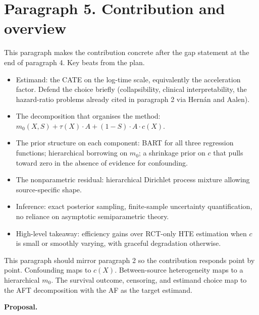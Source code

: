 \newpage
\section*{Paragraph 5. Contribution and overview}

This paragraph makes the contribution concrete after the gap statement at the end of paragraph 4.
Key beats from the plan.
\begin{itemize}
  \item Estimand: the CATE on the log-time scale, equivalently the acceleration factor.
        Defend the choice briefly (collapsibility, clinical interpretability, the hazard-ratio problems already cited in paragraph 2 via Hern\'an and Aalen).
  \item The decomposition that organises the method: $m_0(X, S) + \tau(X)\cdot A + (1-S)\cdot A \cdot c(X)$.
  \item The prior structure on each component: BART for all three regression functions; hierarchical borrowing on $m_0$; a shrinkage prior on $c$ that pulls toward zero in the absence of evidence for confounding.
  \item The nonparametric residual: hierarchical Dirichlet process mixture allowing source-specific shape.
  \item Inference: exact posterior sampling, finite-sample uncertainty quantification, no reliance on asymptotic semiparametric theory.
  \item High-level takeaway: efficiency gains over RCT-only HTE estimation when $c$ is small or smoothly varying, with graceful degradation otherwise.
\end{itemize}

This paragraph should mirror paragraph 2 so the contribution responds point by point.
Confounding maps to $c(X)$.
Between-source heterogeneity maps to a hierarchical $m_0$.
The survival outcome, censoring, and estimand choice map to the AFT decomposition with the AF as the target estimand.

\textbf{Proposal.}


